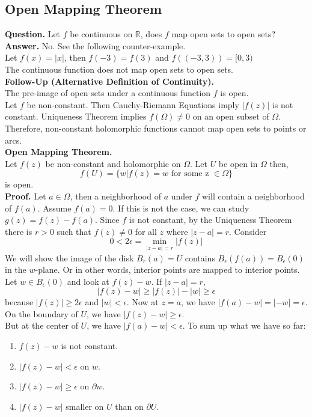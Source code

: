\documentclass[11pt]{article}
\begin{document}
\subsection{Open Mapping Theorem}
\textbf{Question.} Let $f$ be continuous on $\mathbb{R}$, does $f$ map open sets to open sets? \\
\textbf{Answer.} No. See the following counter-example. \\
Let $ f(x) = |x| $, then $ f(-3) = f(3)$ and $f((-3, 3)) = [0, 3)$ \\
The continuous function does not map open sets to open sets.\\
\textbf{Follow-Up (Alternative Definition of Continuity).} \\
The pre-image of open sets under a continuous function $f$ is open. \\
\newline
Let $f$ be non-constant. Then Cauchy-Riemann Equations imply $|f(z)|$ is not constant. Uniqueness Theorem implies $f(\Omega) \neq 0$ on an open subset of $\Omega$. Therefore, non-constant holomorphic functions cannot map open sets to points or arcs. \\
\newline
\textbf{Open Mapping Theorem.} \\
Let $f(z)$ be non-constant and holomorphic on $\Omega$. Let $U$ be open in $\Omega$ then, 
$$ f(U) = \{w| f(z) = w \mbox{ for some z } \in \Omega \} $$ 
is open. \\
\textbf{Proof.} Let $a \in \Omega$, then a neighborhood of $a$ under $f$ will contain a neighborhood of $f(a)$. Assume $f(a) = 0$. If this is not the case, we can study $g(z) = f(z) - f(a)$. Since $f$ is not constant, by the Uniqueness Theorem there is $r > 0$ such that $f(z) \neq 0$ for all $z$ where $|z - a| = r$. Consider 
$$ 0 < 2\epsilon = \min_{|z - a| = r}|f(z)|$$
We will show the image of the disk $B_r(a) = U$ contains $B_\epsilon(f(a)) = B_\epsilon(0)$ in the $w$-plane. Or in other words, interior points are mapped to interior points. Let $w \in B_\epsilon(0)$ and look at $f(z) - w$. If $|z - a| = r$, 
$$|f(z) - w| \geqslant |f(z)| - |w| \geqslant \epsilon$$
because $|f(z)| \geqslant 2\epsilon$ and $|w| < \epsilon$. Now at $z = a$, we have $|f(a) - w| = |-w| = \epsilon$. \\
On the boundary of $U$, we have $|f(z) - w| \geqslant \epsilon$. \\
But at the center of $U$, we have $|f(a) - w| < \epsilon$. 
To sum up what we have so far: 
\begin{enumerate}[nolistsep]
\item $f(z) - w$ is not constant.
\item $|f(z) - w| < \epsilon$ on $w$.
\item $|f(z) - w| \geqslant \epsilon$ on $\partial w$.
\item $|f(z) - w|$ smaller on $U$ than on $\partial U$. 
\end{enumerate}
\end{document}
